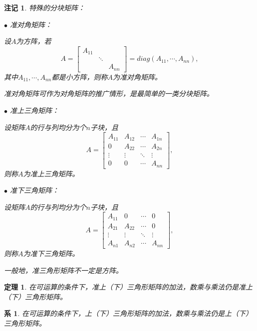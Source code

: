 \documentclass[a4paper]{book}
\newtheorem{cor}{系}[chapter]
\newtheorem{thm}{定理}[chapter]
\newtheorem{rmk}{注记}[chapter]
\newcommand{\enum}{\begin{list}{}{\setlength{\leftmargin}{0pt} \setlength{\itemindent}{2.5em} \setlength{\listparindent}{2em}}}
\begin{document}
\begin{rmk}
特殊的分块矩阵：
\enum
\item[$\bullet$] 准对角矩阵：

设$A$为方阵，若
$$A = \begin{bmatrix} A_{11} & & \\ & \ddots & \\ & & A_{nn} \end{bmatrix} = diag(A_{11},\cdots,A_{nn}),$$
其中$A_{11},\cdots,A_{nn}$都是小方阵，则称$A$为准对角矩阵。

准对角矩阵可作为对角矩阵的推广情形，是最简单的一类分块矩阵。

\item[$\bullet$] 准上三角矩阵：

设矩阵$A$的行与列均分为个$n$子块，且
$$A = \begin{bmatrix} A_{11} & A_{12} & \cdots & A_{1n} \\ 0 & A_{22} & \cdots & A_{2n} \\ \vdots & \vdots & \ddots & \vdots \\ 0 & 0 & \cdots & A_{nn} \end{bmatrix},$$
则称$A$为准上三角矩阵。

\item[$\bullet$] 准下三角矩阵：

设矩阵$A$的行与列均分为个$n$子块，且
$$A = \begin{bmatrix} A_{11} & 0 & \cdots & 0 \\ A_{21} & A_{22} & \cdots & 0 \\ \vdots & \vdots & \ddots & \vdots \\ A_{n1} & A_{n2} & \cdots & A_{nn} \end{bmatrix},$$
则称$A$为准下三角矩阵。

一般地，准三角形矩阵不一定是方阵。
\end{list}
\end{rmk}

\begin{thm}
在可运算的条件下，准上（下）三角形矩阵的加法，数乘与乘法仍是准上（下）三角形矩阵。
\end{thm}

\begin{cor}
在可运算的条件下，上（下）三角形矩阵的加法，数乘与乘法仍是上（下）三角形矩阵。
\end{cor}
\end{document}
